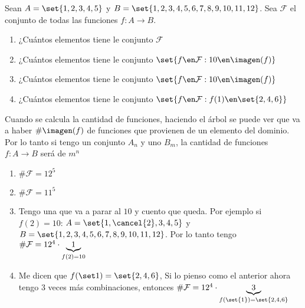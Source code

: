 \ejercicio
Sean $A = \set{1,2,3,4,5}$ y $B = \set{1,2,3,4,5,6,7,8,9,10,11,12}$. Sea $\mathcal F$ el conjunto de todas las funciones
$f: A \to B$.
\begin{enumerate}[label=\roman*)]
	\item  ¿Cuántos elementos tiene le conjunto $\mathcal F$
	\item  ¿Cuántos elementos tiene le conjunto $\set{f \en \mathcal F : 10 \en \imagen(f) }$
	\item  ¿Cuántos elementos tiene le conjunto $\set{f \en \mathcal F : 10 \en \imagen(f)}$
	\item  ¿Cuántos elementos tiene le conjunto $\set{f \en \mathcal F : f(1) \en \set{2,4,6} }$
\end{enumerate}

\separadorCorto

Cuando se calcula la cantidad de funciones, haciendo el árbol se puede ver que va a haber $\#\imagen(f)$ de funciones que provienen
de un elemento del dominio. Por lo tanto si tengo un conjunto $A_n$ y uno $B_m$, la cantidad de funciones $f : A \to B$ será
de $m^n$\\

\begin{enumerate}[label=\roman*)]
	\item $\# \mathcal F = 12^5$

	\item $\# \mathcal F = 11^5$

	\item Tengo una que va a parar al $10$ y cuento que queda. Por ejemplo si $f(2) = 10$: $A = \set{1,\cancel{2},3,4,5}$ y $B = \set{1,2,3,4,5,6,7,8,9,10,11,12}$.
	      Por lo tanto tengo $\# \mathcal F = 12^4 \cdot \underbrace{\normalsize 1}_{f (2) = 10}$\\

	\item Me dicen que $f(\set1) = \set{2,4,6}$,
	      Si lo pienso como el anterior ahora tengo 3 veces más combinaciones, entonces
	      $\# \mathcal F = 12^4 \cdot \underbrace{\tiny 3}_{ f (\set{1})= \set{2,4,6}}$
\end{enumerate}
